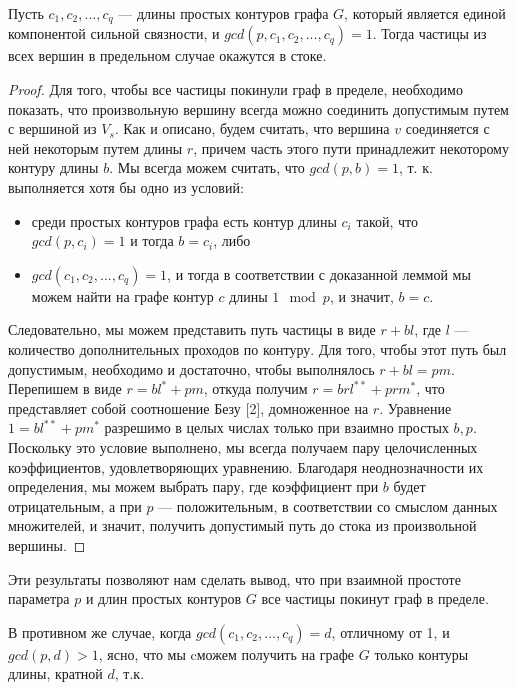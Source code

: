 \begin{theorem}
	Пусть $c_1, c_2, ... , c_q $ --- длины простых контуров графа $G$, который является единой компонентой сильной связности, и $gcd(p, c_1, c_2, ... , c_q) = 1$. Тогда частицы из всех вершин в предельном случае окажутся в стоке.
\end{theorem}

\begin{proof}	
	Для того, чтобы все частицы покинули граф в пределе, необходимо показать, что произвольную вершину всегда можно соединить допустимым путем с вершиной из $V_s$. Как и описано, будем считать, что вершина $v$ соединяется с ней некоторым путем длины $r$, причем часть этого пути принадлежит некоторому контуру длины $b$. Мы всегда можем считать, что $gcd(p, b) = 1$, т. к. выполняется хотя бы одно из условий:
	
	\begin{itemize}
		\item среди простых контуров графа есть контур длины $c_i$ такой, что $gcd(p, c_i) = 1$ и тогда $b = c_i$, либо
		\item $gcd(c_1, c_2, ... , c_q) = 1$, и тогда в соответствии с доказанной леммой мы можем найти на графе контур $c$ длины  $1\mod p$, и значит, $b = c$.
	\end{itemize}
	
	Следовательно, мы можем представить путь частицы в виде $r + bl$, где $l$ --- количество дополнительных проходов по контуру. Для того, чтобы этот путь был допустимым, необходимо и достаточно, чтобы выполнялось $r + bl = pm$. Перепишем в виде $r = bl^* + pm$, откуда получим $r = brl^{**} + prm^*$, что представляет собой соотношение Безу [2], домноженное на $r$. Уравнение $1  =bl^{**} + pm^*$ разрешимо в целых числах только при взаимно простых $b, p$. Поскольку это условие выполнено, мы всегда получаем пару целочисленных коэффициентов, удовлетворяющих уравнению. Благодаря неоднозначности их определения, мы можем выбрать пару, где коэффициент при $b$ будет отрицательным, а при $p$ --- положительным, в соответствии со смыслом данных множителей, и значит, получить допустимый путь до стока из произвольной вершины.
\end{proof}

Эти результаты позволяют нам сделать вывод, что при взаимной простоте параметра $p$ и длин простых контуров $G$ все частицы покинут граф в пределе. 

В противном же случае, когда $gcd(c_1, c_2, ... , c_q) = d$, отличному от 1, и $gcd(p,d) > 1$, ясно, что мы cможем получить на графе $G$ только контуры длины, кратной $d$, т.к. 

